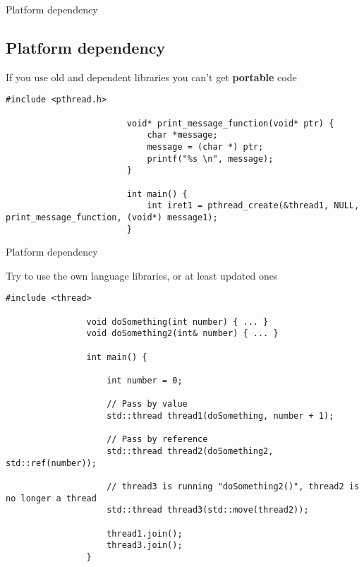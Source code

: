 \documentclass{beamer}
\newcommand{\normalSizeItem}[1] {
  \normalsize{\item #1}
}
\newcommand{\smallCite}[1]{
	\begin{small}
		\cite{#1}	
	\end{small}
}
\begin{document}
		\begin{frame}[fragile]{Platform dependency}	
			\subsection{Platform dependency}		
			\begin{itemize}
				\normalSizeItem { If you use old and dependent libraries you can't get \textbf{portable} code \smallCite{posixThreads}}
						\begin{lstlisting}[basicstyle={\tiny\ttfamily}]
						#include <pthread.h>
		
						void* print_message_function(void* ptr) {
							char *message;
							message = (char *) ptr;
							printf("%s \n", message);
						}
						
						int main() {
							int iret1 = pthread_create(&thread1, NULL, print_message_function, (void*) message1);
						}
					\end{lstlisting}
			\end{itemize}
		\end{frame}
		
		\begin{frame}[fragile]{Platform dependency}	
			\begin{itemize}

				\normalSizeItem { Try to use the own language libraries, or at least updated ones }
				\begin{lstlisting}[basicstyle={\tiny\ttfamily}]
				#include <thread>
				
				void doSomething(int number) { ... }
				void doSomething2(int& number) { ... }
				
				int main() {
				
					int number = 0;
					
					// Pass by value
					std::thread thread1(doSomething, number + 1); 
					
					// Pass by reference
					std::thread thread2(doSomething2, std::ref(number)); 
					
					// thread3 is running "doSomething2()", thread2 is no longer a thread
					std::thread thread3(std::move(thread2)); 
					
					thread1.join();
					thread3.join();					
				}
				
				\end{lstlisting}
				
			\end{itemize}
		\end{frame}
		
\end{document}
